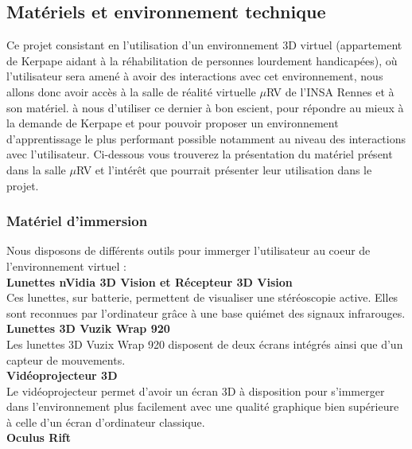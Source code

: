 \subsection{Matériels et environnement technique}

Ce projet consistant en l'utilisation d'un environnement 3D virtuel (appartement de Kerpape aidant à la réhabilitation de personnes lourdement handicapées), où l'utilisateur sera amené à avoir des interactions avec cet environnement, nous allons donc avoir accès à la salle de réalité virtuelle $\mu$RV de l'INSA Rennes et à son matériel. à nous d'utiliser ce dernier à bon escient, pour répondre au mieux à la demande de Kerpape et pour pouvoir proposer un environnement d'apprentissage le plus performant possible notamment au niveau des interactions avec l'utilisateur. 
Ci-dessous vous trouverez la présentation du matériel présent dans la salle $\mu$RV et l'intérêt que pourrait présenter leur utilisation dans le projet.

\subsubsection{Matériel d'immersion}
Nous disposons de différents outils pour immerger l'utilisateur au coeur de l'environnement virtuel : 
\\

\textbf{Lunettes nVidia 3D Vision et Récepteur 3D Vision}
\\

Ces lunettes, sur batterie, permettent de visualiser une stéréoscopie active. Elles sont reconnues par l'ordinateur grâce à une base quiémet des signaux infrarouges.
\\

\textbf{Lunettes 3D Vuzik Wrap 920}
\\

Les lunettes 3D Vuzix Wrap 920 disposent de deux écrans intégrés ainsi que d'un capteur de mouvements.
\\

\textbf{Vidéoprojecteur 3D}
\\

Le vidéoprojecteur permet d'avoir un écran 3D à disposition pour s'immerger dans l'environnement plus facilement avec une qualité graphique bien supérieure à celle d'un écran d'ordinateur classique.
\\


\textbf{Oculus Rift}
\\

